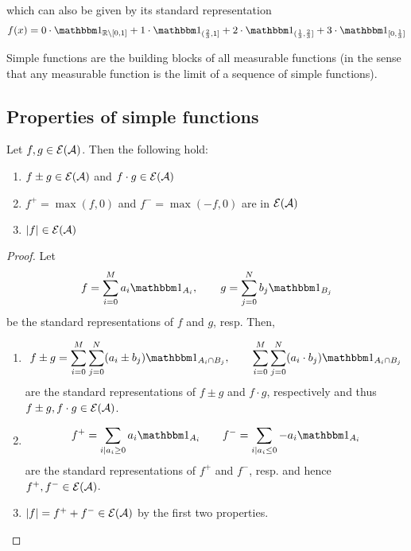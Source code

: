 which can also be given by its standard representation
\begin{align*}
	f(x) = 0 \cdot \ind_{\R\setminus [0, 1]} + 1 \cdot \ind_{(\frac{2}{3}, 1]} + 2 \cdot \ind_{(\frac{1}{3}, \frac{2}{3}]} + 3\cdot\ind_{[0, \frac{1}{3}]}
\end{align*}

Simple functions are the building blocks of all measurable functions (in the sense that any measurable function is the limit of a sequence of simple functions).

\subsection{Properties of simple functions}

\begin{thm}
	\label{thm:prop-simple-functions}
	Let $f, g \in \mathcal{E}(\mathcal{A})$. Then the following hold:
	\begin{enumerate}
		\item $f\pm g \in \mathcal{E}(\mathcal{A})$ and $f\cdot g \in \mathcal{E}(\mathcal{A})$
		\item $f^+ = \max(f, 0)$ and $f^- = \max (-f, 0)$ are in $\mathcal{E}(\mathcal{A})$
		\item $\left\vert{f}\right\vert \in \mathcal{E}(\mathcal{A})$
	\end{enumerate}
\end{thm}

\begin{proof}Let
	\begin{align*}
		f = \sum_{i = 0}^M a_i \ind_{A_i},\qquad g = \sum_{j = 0}^N b_j \ind_{B_j}
	\end{align*}
	be the standard representations of $f$ and $g$, resp. Then,
	\begin{enumerate}
		\item
		\begin{align*}
			f \pm g = \sum_{i=0}^{M}\sum_{j=0}^{N} (a_i \pm b_j)\ind_{A_i \cap B_j},
			\qquad \sum_{i=0}^{M}\sum_{j=0}^{N} (a_i \cdot b_j)\ind_{A_i \cap B_j}
		\end{align*}
		are the standard representations of $f\pm g$ and $f \cdot g$, respectively and thus $f\pm g , f\cdot g \in \mathcal{E}(\mathcal{A})$.
		
		\item
		\begin{align*}
			f^+ = \sum_{i \mid a_i \geq 0} a_i \ind_{A_i} \qquad f^- = \sum_{i \mid a_i \leq 0} - a_i \ind_{A_i}
		\end{align*}
		are the standard representations of $f^+$ and $f^-$, resp. and hence $f^+, f^- \in \mathcal{E}(\mathcal{A})$.
		
		\item $\left\vert{f}\right\vert = f^+ + f^- \in \mathcal{E}(\mathcal{A})$ by the first two properties.
	\end{enumerate}
\end{proof}

